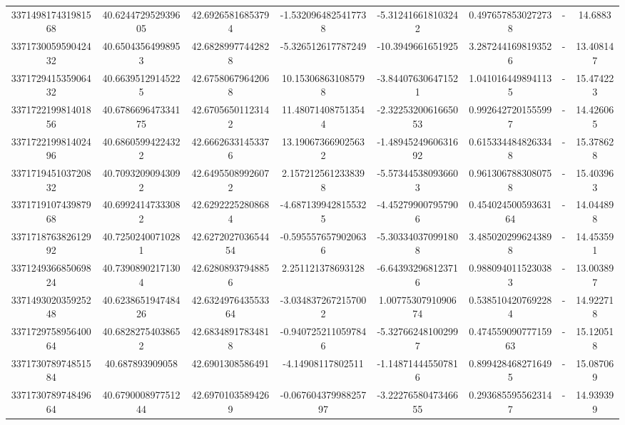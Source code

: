 \documentclass{article}
\begin{document}
\begin{landscape}
\begin{longtable}[c]{S[table-format=18.0]S[table-format=2.15]S[table-format=2.15]S[table-format=-2.17]S[table-format=-2.16]S[table-format=-2.16]S[table-format=-3.16]S[table-format=2.7]}
337149817431981568 & 40.624472952939605 & 42.69265816853794  & -1.5320964825417738   & -5.312416618103242   & 0.4976578530272738   & {-}                  & 14.6883    \\
337173005959042432 & 40.65043564998953  & 42.68289977442828  & -5.326512617787249    & -10.3949661651925    & 3.2872441698193526   & {-}                  & 13.408147  \\
337172941535906432 & 40.66395129145225  & 42.67580679642068  & 10.153068631085798    & -3.844076306471521   & 1.0410164498941135   & {-}                  & 15.474223  \\
337172219981401856 & 40.678669647334175 & 42.67056501123142  & 11.480714087513544    & -2.3225320061665053  & 0.9926427201555997   & {-}                  & 14.426065  \\
337172219981402496 & 40.68605994224322  & 42.66626331453376  & 13.190673669025632    & -1.4894524960631692  & 0.6153344848263348   & {-}                  & 15.378628  \\
337171945103720832 & 40.70932090943092  & 42.64955089926072  & 2.1572125612338398    & -5.573445380936603   & 0.9613067883080758   & {-}                  & 15.403963  \\
337171910743987968 & 40.69924147333082  & 42.62922252808684  & -4.6871399428155325   & -4.452799007957906   & 0.45402450059363164  & {-}                  & 14.044898  \\
337171876382612992 & 40.72502400710281  & 42.627202703654454 & -0.5955576579020636   & -5.303340370991808   & 3.4850202996243898   & {-}                  & 14.453591  \\
337124936685069824 & 40.73908902171304  & 42.62808937948856  & 2.251121378693128     & -6.643932968123716   & 0.9880940115230383   & {-}                  & 13.003897  \\
337149302035925248 & 40.623865194748426 & 42.632497643553364 & -3.0348372672157002   & 1.0077530791090674   & 0.5385104207692284   & {-}                  & 14.922718  \\
337172975895640064 & 40.68282754038652  & 42.68348917834818  & -0.9407252110597846   & -5.327662481002997   & 0.47455909077715963  & {-}                  & 15.120518  \\
337173078974851584 & 40.687893909058    & 42.6901308586491   & -4.14908117802511     & -1.148714445507816   & 0.8994284682716495   & {-}                  & 15.087069  \\
337173078974849664 & 40.679000897751244 & 42.69701035894269  & -0.06760437998825797  & -3.2227658047346655  & 0.2936855955623147   & {-}                  & 14.939399  \\

\end{longtable}
\end{landscape}
\end{document}

